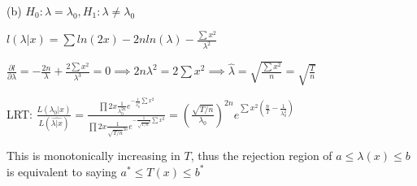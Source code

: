 \documentclass{article}
\let\Oldsum=\sum
\let\Oldprod=\prod
\renewcommand{\sum}{\Oldsum\limits}
\renewcommand{\prod}{\Oldprod\limits}
\begin{document}
(b) $H_0: \lambda = \lambda_0, H_1: \lambda \neq \lambda_0$

$l(\lambda|x) = \sum ln(2x) - 2n ln(\lambda) - \frac{\sum x^2}{\lambda^2}$

$\frac{\partial l}{\partial \lambda} = -\frac{2n}{\lambda} + \frac{2\sum x^2}{\lambda^3} = 0 \implies 2n\lambda^2 = 2\sum x^2 \implies \hat{\lambda} = \sqrt{\frac{\sum x^2}{n}} = \sqrt{\frac{T}{n}}$

LRT: $\frac{L(\lambda_0|x)}{L(\hat{\lambda|x})} = \frac{\prod 2x \frac{1}{\lambda_0^{2n}} e^{-\frac{1}{\lambda_0^2} \sum x^2}}{\prod 2x \frac{1}{\sqrt{T/n}^{2n}} e^{-\frac{1}{\sqrt{T/n}^2} \sum x^2}} = (\frac{\sqrt{T/n}}{\lambda_0})^{2n} e^{\sum x^2 (\frac{n}{T} - \frac{1}{\lambda_0^2})}$

This is monotonically increasing in $T$, thus the rejection region of $a \le \lambda(x) \le b$ is equivalent to saying $a^* \le T(x) \le b^*$
\end{document}
